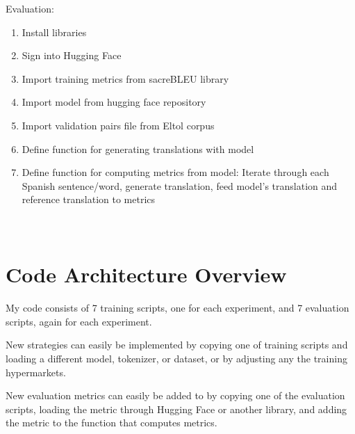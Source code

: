 \documentclass[10pt,twocolumn]{article}
\begin{document}
Evaluation: 
\begin{enumerate}
\item Install libraries
\item Sign into Hugging Face
\item Import training metrics from sacreBLEU library
\item Import model from hugging face repository
\item Import validation pairs file from Eltol corpus
\item Define function for generating translations with model
\item Define function for computing metrics from model: Iterate through each Spanish sentence/word, generate translation, feed model's translation and reference translation to metrics

\end{enumerate}

\section{\\Code Architecture Overview}
My code consists of 7 training scripts, one for each experiment, and 7 evaluation scripts, again for each experiment. 

New strategies can easily be implemented by copying one of training scripts and loading a different model, tokenizer, or dataset, or by adjusting any the training hypermarkets. 

New evaluation metrics can easily be added to by copying one of the evaluation scripts, loading the metric through Hugging Face or another library, and adding the metric to the function that computes metrics.


\printbibliography
\end{document}
